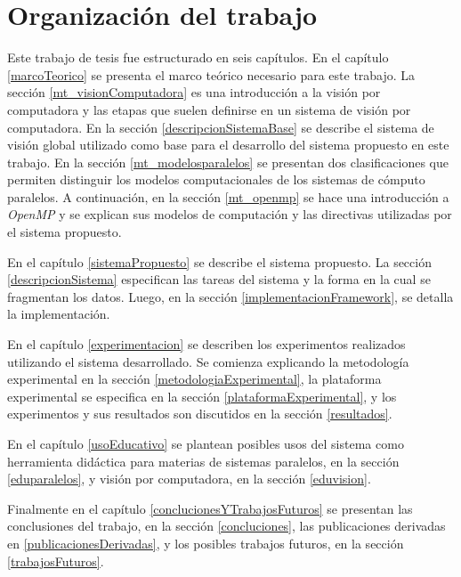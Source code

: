 
\section{Organización del trabajo}

Este trabajo de tesis fue estructurado en seis capítulos. En el capítulo
\ref{marcoTeorico} se presenta el marco teórico necesario para este trabajo. La
sección \ref{mt_visionComputadora} es una introducción a la visión por
computadora y las etapas que suelen definirse en un sistema de visión por
computadora. En la sección \ref{descripcionSistemaBase} se describe el sistema de
visión global utilizado como base para el desarrollo del sistema propuesto en
este trabajo. En la sección \ref{mt_modelosparalelos} se presentan dos
clasificaciones que permiten distinguir los modelos computacionales de los
sistemas de cómputo paralelos. A continuación, en la sección \ref{mt_openmp} se
hace una introducción a \emph{OpenMP} y se explican sus modelos de computación y
las directivas utilizadas por el sistema propuesto.

En el capítulo \ref{sistemaPropuesto} se describe el sistema propuesto. La
sección \ref{descripcionSistema} especifican las tareas del sistema y la forma en
la cual se fragmentan los datos. Luego, en la sección
\ref{implementacionFramework}, se detalla la implementación.

En el capítulo \ref{experimentacion} se describen los experimentos realizados
utilizando el sistema desarrollado. Se comienza explicando la metodología
experimental en la sección \ref{metodologiaExperimental}, la plataforma
experimental se especifica en la sección \ref{plataformaExperimental}, y los
experimentos y sus resultados son discutidos en la sección \ref{resultados}.

En el capítulo \ref{usoEducativo} se plantean posibles usos del sistema como
herramienta didáctica para materias de sistemas paralelos, en la sección
\ref{eduparalelos}, y visión por computadora, en la sección \ref{eduvision}.

Finalmente en el capítulo \ref{conclucionesYTrabajosFuturos} se presentan las
conclusiones del trabajo, en la sección \ref{concluciones}, las publicaciones
derivadas en \ref{publicacionesDerivadas},  y los posibles trabajos futuros, en
la sección \ref{trabajosFuturos}.
